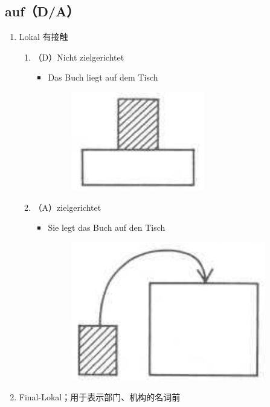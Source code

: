 \documentclass[UTF8]{report}
\begin{document}
\subsection{auf（D/A）}
\begin{enumerate}
    \item Lokal 有接触
    \begin{enumerate}
        \item （D）Nicht zielgerichtet
        \begin{itemize}
            \item Das Buch liegt auf dem Tisch
            \begin{figure}[H]
                \centering
                \includegraphics[scale=0.3]{auf1.png}
            \end{figure}
        \end{itemize}
        \item （A）zielgerichtet
        \begin{itemize}
            \item Sie legt das Buch auf den Tisch
            \begin{figure}[H]
                \centering
                \includegraphics[scale=0.3]{auf2.png}
            \end{figure}
        \end{itemize}
    \end{enumerate}
    \item Final-Lokal；用于表示部门、机构的名词前
    \begin{enumerate}

\end{enumerate}
\end{enumerate}
\end{document}
